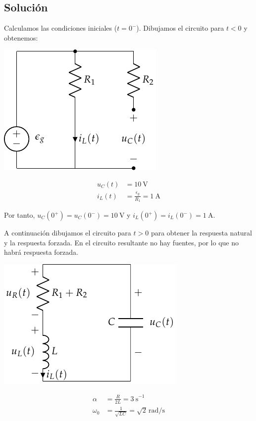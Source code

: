 \subsection*{Solución}

Calculamos las condiciones iniciales ($t = 0^-$). Dibujamos el circuito para $t < 0$ y obtenemos:

\vspace{3mm}
\begin{minipage}{0.3\textwidth}
  \includegraphics{figuras/FM_4_8_t0-}
\end{minipage}
\begin{minipage}{0.7\textwidth}
  \begin{align*}
    u_C(t) &= \SI{10}{\volt}\\
    i_L(t) &= \frac{\epsilon_g}{R_1} = \SI{1}{\ampere}
  \end{align*}
\end{minipage}

\vspace{4mm}
Por tanto, $u_C(0^+) = u_C(0^-) = \SI{10}{\volt}$ \;y\;
$i_L(0^+) = i_L(0^-) = \SI{1}{\ampere}$.

\vspace{3mm}
A continuación dibujamos el circuito para $t > 0$ para obtener la
respuesta natural y la respuesta forzada. En el circuito resultante no
hay fuentes, por lo que no habrá respuesta forzada.

\vspace{3mm}
\begin{minipage}{0.3\textwidth}
  \includegraphics{figuras/FM_4_8_natural}
\end{minipage}
\begin{minipage}{0.7\textwidth}
  \begin{align*}
    \alpha &= \frac{R}{2L} = \SI{3}{\second}^{-1}\\
    \omega_0 &= \frac{1}{\sqrt{LC}} = \sqrt{2}\,\si{\radian\per\second}
  \end{align*}
\end{minipage}

